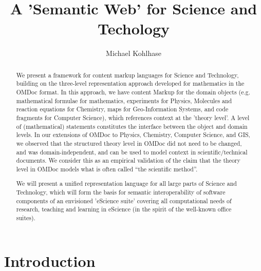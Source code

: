 \documentclass{llncs}
\title{A 'Semantic Web' for Science and Techology}
\author{Michael Kohlhase}
\institute{Computer Science, International University Bremen\\
  \email{m.kohlhase@iu-bremen.de}}
\begin{document}

\maketitle\vspace{-.5cm}

\begin{abstract}
  We present a framework for content markup languages for Science and Technology, building
  on the three-level representation approach developed for mathematics in the OMDoc
  format. In this approach, we have content Markup for the domain objects
  (e.g. mathematical formulae for mathematics, experiments for Physics, Molecules and
  reaction equations for Chemistry, maps for Geo-Information Systems, and code fragments
  for Computer Science), which references context at the 'theory level'. A level of
  (mathematical) statements constitutes the interface between the object and domain
  levels. In our extensions of OMDoc to Physics, Chemistry, Computer Science, and GIS, we
  observed that the structured theory level in OMDoc did not need to be changed, and was
  domain-independent, and can be used to model context in scientific/technical
  documents. We consider this as an empirical validation of the claim that the theory
  level in OMDoc models what is often called ``the scientific method''. 

  We will present a unified representation language for all large parts of Science and
  Technology, which will form the basis for semantic interoperability of software
  components of an envisioned 'eScience suite' covering all computational needs of
  research, teaching and learning in eScience (in the spirit of the well-known office
  suites).
\end{abstract}


\section{Introduction}\label{sec:intro}
\end{document}
